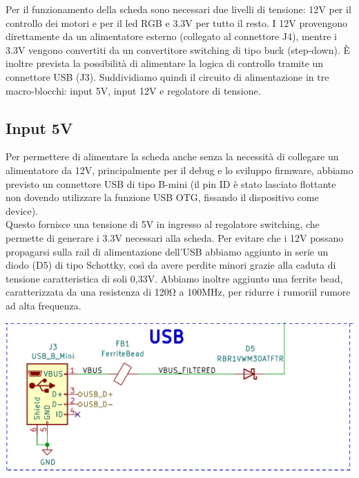 \noindent Per il funzionamento della scheda sono necessari due livelli di tensione: 
12V per il controllo dei motori e per il led RGB e 3.3V per tutto il resto. 
I 12V provengono direttamente da un alimentatore esterno (collegato al connettore J4), 
mentre i 3.3V vengono convertiti da un convertitore switching di tipo buck (step-down). 
È inoltre prevista la possibilità di alimentare la logica di controllo tramite un connettore USB (J3). 
Suddividiamo quindi il circuito di alimentazione in tre macro-blocchi: input 5V, input 12V e regolatore di tensione.

\hypertarget{input-5V}{
\subsection{\texorpdfstring{Input 5V}{Input 5V}}\label{input-5V}}

Per permettere di alimentare la scheda anche senza la necessità di collegare un 
alimentatore da 12V, principalmente per il debug e lo sviluppo firmware, abbiamo 
previsto un connettore USB di tipo B-mini (il pin ID è stato lasciato flottante non 
dovendo utilizzare la funzione USB OTG, fissando il dispositivo come device).\\
Questo fornisce una tensione di 5V in ingresso al regolatore switching, che permette di generare i 3.3V 
necessari alla scheda. Per evitare che i 12V possano propagarsi sulla rail di alimentazione dell’USB abbiamo 
aggiunto in serie un diodo (D5) di tipo Schottky, così da avere perdite minori grazie alla caduta di tensione 
caratteristica di soli 0,33V.
Abbiamo inoltre aggiunto una ferrite bead, caratterizzata da una resistenza di 120Ω a 100MHz, per
ridurre i rumoriil rumore ad alta frequenza.

\begin{center}
\includegraphics[scale=0.4]{figures/image60.png}
\captionsetup{type=figure}
\end{center}

